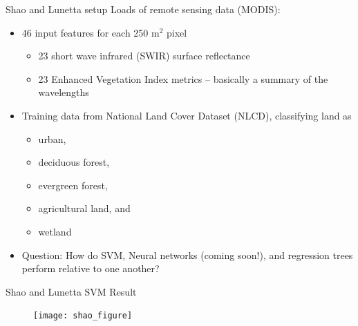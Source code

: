 \documentclass[mathserif, aspectratio=169]{beamer}
\begin{document}
\begin{frame}{Shao and Lunetta setup}
Loads of remote sensing data (MODIS):
\begin{itemize}
\item 46 input features for each 250 m$^2$ pixel
\begin{itemize}
\item 23 short wave infrared (SWIR) surface reflectance
\item 23 Enhanced Vegetation Index metrics -- basically a summary of the wavelengths
\end{itemize}
\item Training data from National Land Cover Dataset (NLCD), classifying land as
\begin{itemize}
\item urban, 
\item deciduous forest, 
\item evergreen forest, 
\item agricultural land, and 
\item wetland
\end{itemize}

\item Question: How do SVM, Neural networks (coming soon!), and regression trees perform relative to one another?
\end{itemize}
\end{frame}


\begin{frame}{Shao and Lunetta SVM Result}

\begin{figure}
\texttt{[image: shao\_figure]}
\caption*{}
\end{figure}
\end{frame}
\end{document}
